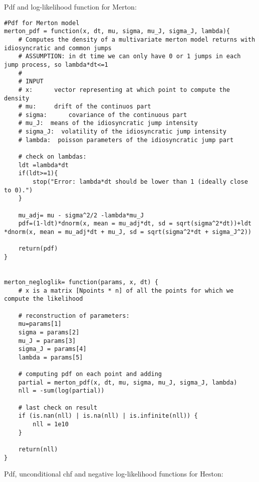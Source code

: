 \bigskip
\noindent
Pdf and log-likelihood function for Merton:
\begin{lstlisting}
#Pdf for Merton model
merton_pdf = function(x, dt, mu, sigma, mu_J, sigma_J, lambda){
	# Computes the density of a multivariate merton model returns with idiosyncratic and common jumps
	# ASSUMPTION: in dt time we can only have 0 or 1 jumps in each jump process, so lambda*dt<=1
	#
	# INPUT
	# x:      vector representing at which point to compute the density 
	# mu:     drift of the continuos part 
	# sigma:      covariance of the continuous part 
	# mu_J:  means of the idiosyncratic jump intensity 
	# sigma_J:  volatility of the idiosyncratic jump intensity 
	# lambda:  poisson parameters of the idiosyncratic jump part 
	
	# check on lambdas: 
	ldt =lambda*dt
	if(ldt>=1){
		stop("Error: lambda*dt should be lower than 1 (ideally close to 0).")
	}
	
	mu_adj= mu - sigma^2/2 -lambda*mu_J 
	pdf=(1-ldt)*dnorm(x, mean = mu_adj*dt, sd = sqrt(sigma^2*dt))+ldt *dnorm(x, mean = mu_adj*dt + mu_J, sd = sqrt(sigma^2*dt + sigma_J^2))
	
	return(pdf)
}


merton_negloglik= function(params, x, dt) {
	# x is a matrix [Npoints * n] of all the points for which we compute the likelihood
	
	# reconstruction of parameters:
	mu=params[1]
	sigma = params[2]
	mu_J = params[3]
	sigma_J = params[4]
	lambda = params[5]
	
	# computing pdf on each point and adding
	partial = merton_pdf(x, dt, mu, sigma, mu_J, sigma_J, lambda)
	nll = -sum(log(partial))
	
	# last check on result
	if (is.nan(nll) | is.na(nll) | is.infinite(nll)) {
		nll = 1e10
	}
	
	return(nll)
}
\end{lstlisting}


\bigskip
\noindent
Pdf, unconditional chf and negative log-likelihood functions for Heston:

